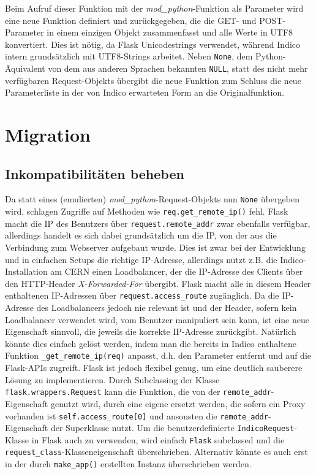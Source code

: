 Beim Aufruf dieser Funktion mit der \emph{mod\_python}-Funktion als Parameter wird eine neue
Funktion definiert und zurückgegeben, die die GET- und POST-Parameter in einem einzigen Objekt
zusammenfasst und alle Werte in UTF8 konvertiert. Dies ist nötig, da Flask Unicodestrings verwendet,
während Indico intern grundsätzlich mit UTF8-Strings arbeitet. Neben \lstinline{None}, dem
Python-Äquivalent von dem aus anderen Sprachen bekannten \lstinline{NULL}, statt des nicht mehr
verfügbaren Request-Objekts übergibt die neue Funktion zum Schluss die neue Parameterliste in der
von Indico erwarteten Form an die Originalfunktion.


\section{Migration}

\subsection{Inkompatibilitäten beheben}
Da statt eines (emulierten) \emph{mod\_python}-Request-Objekts nun \lstinline{None} übergeben wird,
schlagen Zugriffe auf Methoden wie \lstinline{req.get_remote_ip()} fehl. Flask macht die IP des
Benutzers über \lstinline{request.remote_addr} zwar ebenfalls verfügbar, allerdings handelt es sich
dabei grundsätzlich um die IP, von der aus die Verbindung zum Webserver aufgebaut wurde. Dies ist
zwar bei der Entwicklung und in einfachen Setups die richtige IP-Adresse, allerdings nutzt
z.B. die Indico-Installation am CERN einen Loadbalancer, der die IP-Adresse des Clients
über den HTTP-Header \emph{X-Forwarded-For} übergibt. Flask macht alle in diesem Header enthaltenen
IP-Adressen über \lstinline{request.access_route} zugänglich. Da die IP-Adresse des Loadbalancers
jedoch nie relevant ist und der Header, sofern kein Loadbalancer verwendet wird, vom Benutzer
manipuliert sein kann, ist eine neue Eigenschaft sinnvoll, die jeweils die korrekte IP-Adresse
zurückgibt. Natürlich könnte dies einfach gelöst werden, indem man die bereits in Indico enthaltene
Funktion \lstinline{_get_remote_ip(req)} anpasst, d.h. den Parameter entfernt und auf die Flask-APIs
zugreift. Flask ist jedoch flexibel genug, um eine deutlich sauberere Lösung zu implementieren.
Durch Subclassing der Klasse \lstinline{flask.wrappers.Request} kann die Funktion, die von der
\lstinline{remote_addr}-Eigenschaft genutzt wird, durch eine eigene ersetzt werden, die sofern ein
Proxy vorhanden ist \lstinline{self.access_route[0]} und ansonsten die
\lstinline{remote_addr}-Eigenschaft der Superklasse nutzt. Um die benutzerdefinierte
\lstinline{IndicoRequest}-Klasse in Flask auch zu verwenden, wird einfach \lstinline{Flask}
subclassed und die \lstinline{request_class}-Klasseneigenschaft überschrieben. Alternativ könnte es
auch erst in der durch \lstinline{make_app()} erstellten Instanz überschrieben werden.

